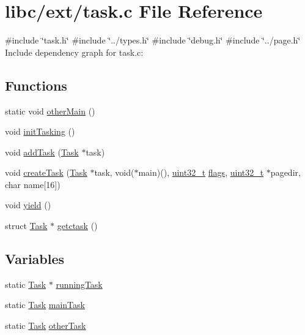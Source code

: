 \hypertarget{a00047}{}\section{libc/ext/task.c File Reference}
\label{a00047}
{\ttfamily \#include \char`\"{}task.\+h\char`\"{}}\newline
{\ttfamily \#include \char`\"{}../types.\+h\char`\"{}}\newline
{\ttfamily \#include \char`\"{}debug.\+h\char`\"{}}\newline
{\ttfamily \#include \char`\"{}../page.\+h\char`\"{}}\newline
Include dependency graph for task.\+c\+:
\subsection*{Functions}
\begin{DoxyCompactItemize}
\item 
static void \hyperlink{a00047_a4337f8ca98d2a8f8e09bf6e26b4e8bb0_a4337f8ca98d2a8f8e09bf6e26b4e8bb0}{other\+Main} ()
\item 
void \hyperlink{a00047_aea945e91746a54801f4763ad264746b9_aea945e91746a54801f4763ad264746b9}{init\+Tasking} ()
\item 
void \hyperlink{a00047_a2814ff5e4f081736448dc705b05edcd1_a2814ff5e4f081736448dc705b05edcd1}{add\+Task} (\hyperlink{a00136}{Task} $\ast$task)
\item 
void \hyperlink{a00047_ad60a944f16bf46088320833cf2464e1e_ad60a944f16bf46088320833cf2464e1e}{create\+Task} (\hyperlink{a00136}{Task} $\ast$task, void($\ast$main)(), \hyperlink{a00095_a435d1572bf3f880d55459d9805097f62_a435d1572bf3f880d55459d9805097f62}{uint32\+\_\+t} \hyperlink{a00068_aa2585d779da0ab21273a8d92de9a0ebe_aa2585d779da0ab21273a8d92de9a0ebe}{flags}, \hyperlink{a00095_a435d1572bf3f880d55459d9805097f62_a435d1572bf3f880d55459d9805097f62}{uint32\+\_\+t} $\ast$pagedir, char name\mbox{[}16\mbox{]})
\item 
void \hyperlink{a00047_a58c8b2ad0ea491a6642e5e1cbd358c89_a58c8b2ad0ea491a6642e5e1cbd358c89}{yield} ()
\item 
struct \hyperlink{a00136}{Task} $\ast$ \hyperlink{a00047_a5913e9b2190b2b4118ee020721a320e2_a5913e9b2190b2b4118ee020721a320e2}{getctask} ()
\end{DoxyCompactItemize}
\subsection*{Variables}
\begin{DoxyCompactItemize}
\item 
static \hyperlink{a00136}{Task} $\ast$ \hyperlink{a00047_a2c195d425b4a6791b3a89f7b219f93d9_a2c195d425b4a6791b3a89f7b219f93d9}{running\+Task}
\item 
static \hyperlink{a00136}{Task} \hyperlink{a00047_a228ac88416ebaa8713846e3e5e3e9b6d_a228ac88416ebaa8713846e3e5e3e9b6d}{main\+Task}
\item 
static \hyperlink{a00136}{Task} \hyperlink{a00047_ab0e87ab98b8b029839a398838d16e1f0_ab0e87ab98b8b029839a398838d16e1f0}{other\+Task}
\end{DoxyCompactItemize}


